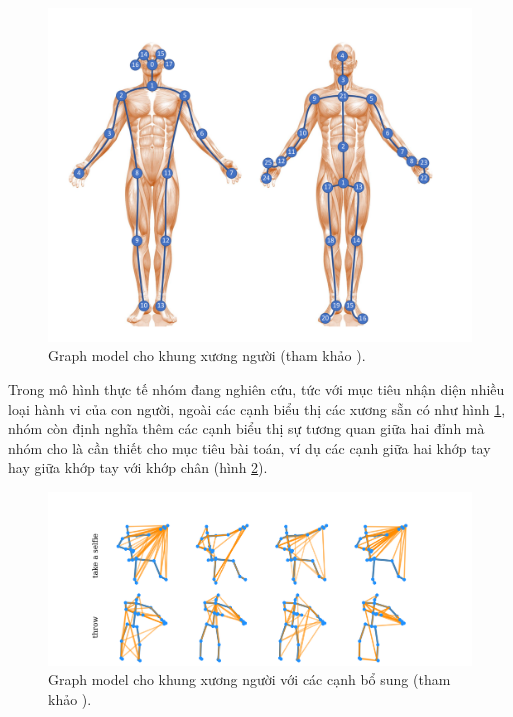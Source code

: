 \begin{figure}[!htp]
    \begin{center}
        \includegraphics[width=\linewidth]{asset/image/skeleton.png}
        \caption{Graph model cho khung xương người (tham khảo \cite{shi2020skeleton}). }
        \label{fig:skeleton}
    \end{center}
\end{figure}

Trong mô hình thực tế nhóm đang nghiên cứu, tức với mục tiêu nhận diện nhiều loại hành vi của con người, ngoài các cạnh biểu thị các xương sẵn có như hình \ref{fig:skeleton}, nhóm còn định nghĩa thêm các cạnh biểu thị sự tương quan giữa hai đỉnh mà nhóm cho là cần thiết cho mục tiêu bài toán, ví dụ các cạnh giữa hai khớp tay hay giữa khớp tay với khớp chân (hình \ref{fig:morebones}).

\begin{figure}[!htp]
    \begin{center}
        \includegraphics[width=\linewidth]{asset/image/morebones.png}
        \caption{Graph model cho khung xương người với các cạnh bổ sung (tham khảo \cite{shi2020skeleton}). }
        \label{fig:morebones}
    \end{center}
\end{figure}

